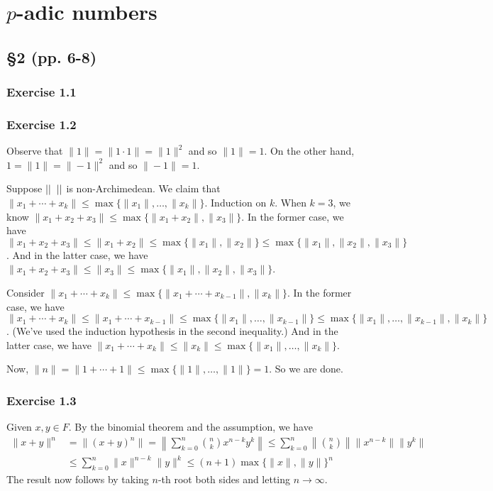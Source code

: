 \documentclass[../Koblitz.tex]{subfiles}
\begin{document}
\chapter{\texorpdfstring{$p$}{p}-adic numbers}

\section*{\S2 (pp. 6-8)}

\subsection*{Exercise 1.1}

\subsection*{Exercise 1.2}

Observe that $\|1\|=\|1\cdot1\|=\|1\|^2$ and so $\|1\|=1$. On the other hand, $1=\|1\|=\|-1\|^2$ and so $\|-1\|=1$.

Suppose $\dnr$ is non-Archimedean. We claim that $\|x_1+\cdots+x_k\| \leq \max{\{\|x_1\|,\ldots,\|x_k\|\}}$. Induction on $k$. When $k=3$, we know $\|x_1+x_2+x_3\| \leq \max\{\|x_1+x_2\|,\|x_3\|\}$. In the former case, we have $\|x_1+x_2+x_3\| \leq \|x_1+x_2\| \leq \max\{\|x_1\|,\|x_2\|\} \leq \max\{\|x_1\|,\|x_2\|,\|x_3\|\}$. And in the latter case, we have $\|x_1+x_2+x_3\| \leq \|x_3\| \leq \max\{\|x_1\|,\|x_2\|,\|x_3\|\}$.

Consider $\|x_1+\cdots+x_k\| \leq \max\{\|x_1+\cdots+x_{k-1}\|,\|x_k\|\}$. In the former case, we have $\|x_1+\cdots+x_k\| \leq \|x_1+\cdots+x_{k-1}\| \leq \max\{\|x_1\|,\ldots,\|x_{k-1}\|\} \leq \max\{\|x_1\|,\ldots,\|x_{k-1}\|,\|x_k\|\}$. (We've used the induction hypothesis in the second inequality.) And in the latter case, we have $\|x_1+\cdots+x_k\| \leq \|x_k\| \leq \max\{\|x_1\|,\ldots,\|x_k\|\}$.

Now, $\|n\|=\|1+\cdots+1\| \leq \max\{\|1\|,\ldots,\|1\|\}=1$. So we are done.

\subsection*{Exercise 1.3}

Given $x,y\in F$. By the binomial theorem and the assumption, we have 
\begin{align*}
\|x+y\|^n &= \|(x+y)^n\| = \left\|\sum_{k=0}^n \binom{n}{k}x^{n-k}y^k\right\| \leq \sum_{k=0}^n \left\|\binom{n}{k}\right\|\|x^{n-k}\|\|y^k\| \\
&\leq \sum_{k=0}^n \|x\|^{n-k} \|y\|^k \leq (n+1)\max\{\|x\|,\|y\|\}^n
\end{align*}
The result now follows by taking $n$-th root both sides and letting $n\to\infty$.
\end{document}
